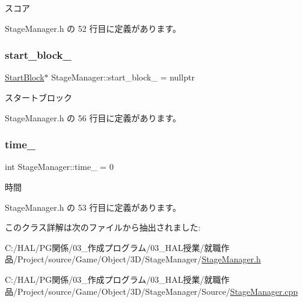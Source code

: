 スコア 



 Stage\+Manager.\+h の 52 行目に定義があります。

\mbox{\label{class_stage_manager_a0ce3838c9fe4eaa1c9f8a6ecf361ea7a}} 
\subsubsection{\texorpdfstring{start\+\_\+block\+\_\+}{start\_block\_}}
{\footnotesize\ttfamily \mbox{\hyperlink{class_start_block}{Start\+Block}}$\ast$ Stage\+Manager\+::start\+\_\+block\+\_\+ = nullptr\hspace{0.3cm}{\ttfamily [private]}}



スタートブロック 



 Stage\+Manager.\+h の 56 行目に定義があります。

\mbox{\label{class_stage_manager_afdb8bffaa00e7c4ed1ebbf136137f6e6}} 
\subsubsection{\texorpdfstring{time\+\_\+}{time\_}}
{\footnotesize\ttfamily int Stage\+Manager\+::time\+\_\+ = 0\hspace{0.3cm}{\ttfamily [private]}}



時間 



 Stage\+Manager.\+h の 53 行目に定義があります。



このクラス詳解は次のファイルから抽出されました\+:\begin{DoxyCompactItemize}
\item 
C\+:/\+H\+A\+L/\+P\+G関係/03\+\_\+作成プログラム/03\+\_\+\+H\+A\+L授業/就職作品/\+Project/source/\+Game/\+Object/3\+D/\+Stage\+Manager/\mbox{\hyperlink{_stage_manager_8h}{Stage\+Manager.\+h}}\item 
C\+:/\+H\+A\+L/\+P\+G関係/03\+\_\+作成プログラム/03\+\_\+\+H\+A\+L授業/就職作品/\+Project/source/\+Game/\+Object/3\+D/\+Stage\+Manager/\+Source/\mbox{\hyperlink{_stage_manager_8cpp}{Stage\+Manager.\+cpp}}\end{DoxyCompactItemize}
